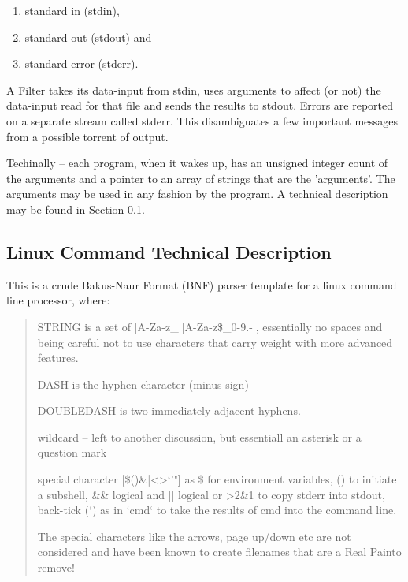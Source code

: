 \vspace{-.15cm}
\begin{enumerate}\addtolength{\itemsep}{-0.5\baselineskip}
   \item  standard in (stdin),
   \item  standard out (stdout) and 
   \item  standard error (stderr).
\end{enumerate}

A Filter takes its data-input from stdin, uses arguments to affect (or
not) the data-input read for that file and sends the results to stdout.
Errors are reported on a separate stream called stderr. This disambiguates
a few important messages from a possible torrent of output.

Techinally -- each program, when it wakes up, has an unsigned integer
count of the arguments and a pointer to an array of strings that are
the 'arguments'. The arguments may be used in any fashion by the program.
A technical description may be found in Section \ref{sec:technicaldescription}.

\subsection{Linux Command Technical Description}  \label{sec:technicaldescription}

This is a crude Bakus-Naur Format (BNF) parser template for a linux command
line processor, where:

\begin{quote}
   STRING is a set of [A-Za-z\_][A-Za-z\$\_0-9.-], essentially no spaces
   and being careful not to use characters that carry weight with more
   advanced features.

   DASH is the hyphen character (minus sign)

   DOUBLEDASH is two immediately adjacent hyphens.

   wildcard -- left to another discussion, but essentiall an asterisk or a 
   question mark

   special character [\$()\&|<>`'"] as \$ for environment variables, () to initiate
   a subshell, \&\& logical and || logical or >2\&1 to copy stderr into stdout,
   back-tick (`) as in `cmd` to take the results of cmd into the command line.

   The special characters like the arrows, page up/down etc are not considered
   and have been known to create filenames that are a Real Pain\texttrademark to remove!


\end{quote}

